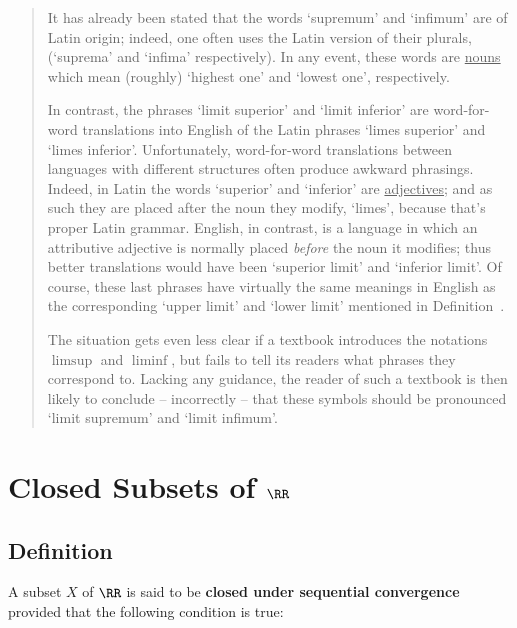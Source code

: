 {\begin{quotation}
{       It has already been stated that the words `supremum' and `infimum' are of Latin origin;
    indeed, one often uses the Latin version of their plurals, (`suprema' and  `infima' respectively).
    In any event, these words are \underline{nouns} which mean (roughly) `highest one' and `lowest one', respectively.

        In contrast, the phrases `limit superior' and `limit inferior' are word-for-word translations into English of the Latin phrases `limes superior' and `limes inferior'.
    Unfortunately, word-for-word translations between languages with different structures often produce awkward phrasings.
    Indeed,  in Latin the words `superior' and `inferior' are \underline{adjectives}; and as such they are placed after the noun they modify, `limes', because that's proper Latin grammar.
    English, in contrast, is a language in which an attributive adjective is normally placed {\em before} the noun it modifies;
    thus  better translations would have been `superior limit' and `inferior limit'.
    Of course, these last phrases have virtually the same meanings in English as the corresponding `upper limit' and `lower limit' mentioned in Definition~.

        The situation gets even less clear if a textbook introduces the notations $\limsup$ and $\liminf$,
    but fails to tell its readers what phrases they correspond to.
    Lacking any guidance, the reader of such a textbook is then likely to conclude -- incorrectly -- that these symbols should be pronounced `limit supremum' and `limit infimum'.
}%
\end{quotation}

}%
\V
\V


\V
\V


                \section{{\bf Closed Subsets of ${\RR}$}}
                \label{SectC80}

           \subsection{\small{\bf Definition}}
            \label{DefC80.10}

        A subset $X$ of ${\RR}$ is said to be {\bf closed under sequential convergence} provided that the following condition is true:

